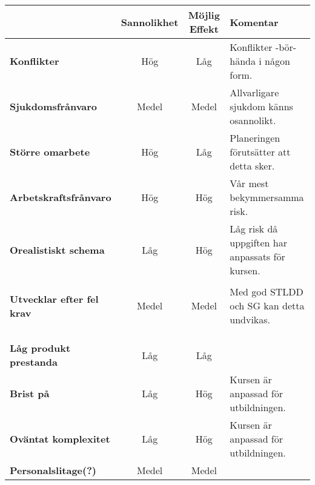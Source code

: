 \documentclass[paper=a4, fontsize=11pt,twoside]{article}
\begin{document}
\begin{tabular}{| l | c | c | l |}
\hline
	& \textbf{Sannolikhet} & \textbf{Möjlig Effekt} & \textbf{Komentar} \\
\hline
\textbf{Konflikter} & Hög & Låg & Konflikter -bör- hända i någon form. \\
\hline
\textbf{Sjukdomsfrånvaro} & Medel & Medel & Allvarligare sjukdom känns osannolikt. \\
\hline
\textbf{Större omarbete} & Hög & Låg & Planeringen förutsätter att detta sker. \\
\hline
\textbf{Arbetskraftsfrånvaro} & Hög & Hög & Vår mest bekymmersamma risk. \\
\hline
\textbf{Orealistiskt schema} & Låg & Hög & Låg risk då uppgiften har anpassats för kursen.\\
 & & & {\color{red}{kommer inte risken från oss mer än kursen?}} \\
\hline
\textbf{Utvecklar efter fel krav} & Medel & Medel & Med god STLDD och SG kan detta undvikas. \\
{\color{red}{Funkioner}} & & &  \\
{\color{red}{Interface}} & & &  \\
{\color{red}{``Gold plating''}} & & &  \\
\hline
\textbf{Låg produkt prestanda} & Låg & Låg &  \\
\hline
\textbf{Brist på {\color{red}{kunskaper}}} & Låg & Hög & Kursen är anpassad för utbildningen. \\

\hline
\textbf{Oväntat komplexitet} & Låg & Hög & Kursen är anpassad för utbildningen.  \\
\hline
\textbf{Personalslitage(?)} & Medel & Medel &  \\
\hline

\end{tabular}
%	
%	
%	
%
%
\end{document}
